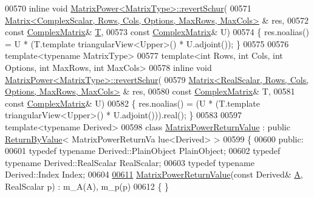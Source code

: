 \begin{DoxyCode}
00570 \textcolor{keyword}{inline} \textcolor{keywordtype}{void} \hyperlink{class_eigen_1_1_matrix_power}{MatrixPower<MatrixType>::revertSchur}(
00571     \hyperlink{group___core___module_class_eigen_1_1_matrix}{Matrix<ComplexScalar, Rows, Cols, Options, MaxRows, MaxCols>}
      & res,
00572     \textcolor{keyword}{const} \hyperlink{group___core___module}{ComplexMatrix}& \hyperlink{group___sparse_core___module}{T},
00573     \textcolor{keyword}{const} \hyperlink{group___core___module}{ComplexMatrix}& U)
00574 \{ res.noalias() = U * (T.template triangularView<Upper>() * U.adjoint()); \}
00575 
00576 \textcolor{keyword}{template}<\textcolor{keyword}{typename} MatrixType>
00577 \textcolor{keyword}{template}<\textcolor{keywordtype}{int} Rows, \textcolor{keywordtype}{int} Cols, \textcolor{keywordtype}{int} Options, \textcolor{keywordtype}{int} MaxRows, \textcolor{keywordtype}{int} MaxCols>
00578 \textcolor{keyword}{inline} \textcolor{keywordtype}{void} \hyperlink{class_eigen_1_1_matrix_power}{MatrixPower<MatrixType>::revertSchur}(
00579     \hyperlink{group___core___module_class_eigen_1_1_matrix}{Matrix<RealScalar, Rows, Cols, Options, MaxRows, MaxCols>}
      & res,
00580     \textcolor{keyword}{const} \hyperlink{group___core___module}{ComplexMatrix}& T,
00581     \textcolor{keyword}{const} \hyperlink{group___core___module}{ComplexMatrix}& U)
00582 \{ res.noalias() = (U * (T.template triangularView<Upper>() * U.adjoint())).real(); \}
00583 
00597 \textcolor{keyword}{template}<\textcolor{keyword}{typename} Derived>
00598 \textcolor{keyword}{class }\hyperlink{class_eigen_1_1_matrix_power_return_value}{MatrixPowerReturnValue} : \textcolor{keyword}{public} \hyperlink{group___core___module_class_eigen_1_1_return_by_value}{ReturnByValue}< MatrixPowerReturnVa
      lue<Derived> >
00599 \{
00600   \textcolor{keyword}{public}:
00601     \textcolor{keyword}{typedef} \textcolor{keyword}{typename} Derived::PlainObject PlainObject;
00602     \textcolor{keyword}{typedef} \textcolor{keyword}{typename} Derived::RealScalar RealScalar;
00603     \textcolor{keyword}{typedef} \textcolor{keyword}{typename} Derived::Index Index;
00604 
\hyperlink{class_eigen_1_1_matrix_power_return_value_a3067e09b352f967a23bb2a9c50afee88}{00611}     \hyperlink{class_eigen_1_1_matrix_power_return_value_a3067e09b352f967a23bb2a9c50afee88}{MatrixPowerReturnValue}(\textcolor{keyword}{const} Derived& \hyperlink{group___core___module_class_eigen_1_1_matrix}{A}, RealScalar p) : m\_A(A), m\_p(p)
00612     \{ \}

\end{DoxyCode}
